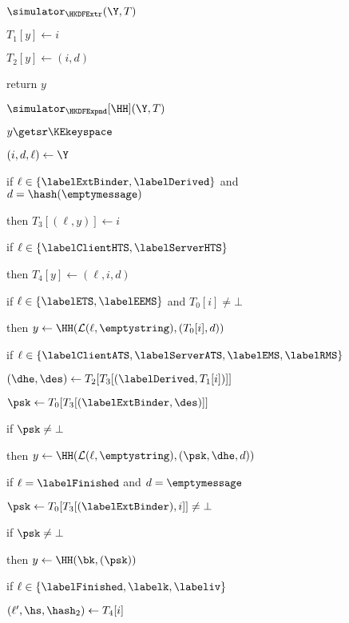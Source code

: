 \begin{figure}[tp]
\begin{minipage}[t]{0.48\textwidth}
\begin{oracle}{$\simulator_{\HKDFExtr}(\Y, T)$}
				\item \quad $T_{1}[y] \gets i$
				\item $T_{2}[y] \gets (i,d)$
				\item return $y$
			\end{oracle}
		\end{minipage}
		\begin{minipage}[t]{0.49\textwidth}
			\ExptSepSpace
			\begin{oracle}{$\simulator_{\HKDFExpnd}[\HH](\Y, T)$}
				\item $y \getsr \KEkeyspace$
				\item $(i, d, \ell) \gets \Y$
				\item if $\ell \in \{\labelExtBinder, \labelDerived\}$ and $d = \hash(\emptymessage)$
				\item \quad then $T_{3}[(\ell,y)] \gets i$
				\item if $\ell \in \{\labelClientHTS, \labelServerHTS\}$
				\item \quad then $T_{4}[y] \gets (\ell, i, d)$
				\item	
				\item if $\ell \in \{\labelETS, \labelEEMS\}$ and $T_{0}[i] \neq \bot$
				\item \quad then $y \gets \HH(\mathcal{L}(\ell,\emptystring),(T_{0}[i], d))$
				\item
				\item if $\ell \in \{ \labelClientATS, \labelServerATS,\labelEMS, \labelRMS \}$
				\item \quad $(\dhe, \des) \gets T_2[T_3[(\labelDerived, T_1[i])]]$
				\item \quad $\psk \gets T_0[T_3[(\labelExtBinder, \des)]]$
				\item \quad if $\psk\neq \bot$
				\item \quad \quad then $y \gets \HH(\mathcal{L} (\ell,\emptystring),(\psk, \dhe, d))$ 
				\item
				\item if $\ell = \labelFinished$ and $d = \emptymessage$ 
				\item \quad $\psk \gets T_0[T_3[(\labelExtBinder), i]]\neq \bot$
				\item \quad if $\psk \neq \bot$ 
				\item \quad \quad then $y \gets \HH(\bk,(\psk))$
				\item 
				\item if $\ell \in \{\labelFinished, \labelk, \labeliv \}$
				\item \quad $(\ell', \hs, \hash_2) \gets T_4[i]$

\end{oracle}
\end{minipage}
\end{figure}

